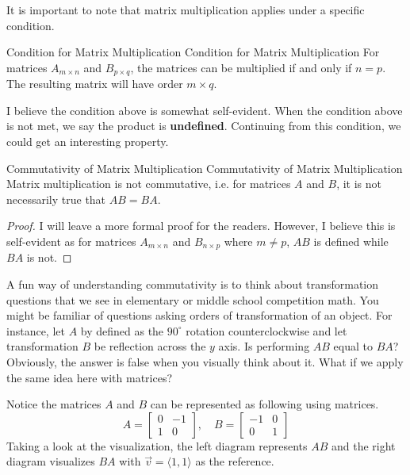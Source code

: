 \documentclass[../main.tex]{subfiles}
\begin{document}
It is important to note that matrix multiplication applies under
a specific condition.

\begin{theorem}{Condition for Matrix Multiplication}
{Condition for Matrix Multiplication}
For matrices $A_{m \times n}$ and $B_{p \times q}$, the matrices
can be multiplied if and only if $n = p$. The resulting matrix
will have order $m \times q$.
\end{theorem}

I believe the condition above is somewhat self-evident. When the
condition above is not met, we say the product is \textbf{undefined}.
Continuing from this condition, we could get an interesting property.

\begin{theorem}{Commutativity of Matrix Multiplication}
{Commutativity of Matrix Multiplication}
Matrix multiplication is not commutative, i.e. for matrices $A$ and
$B$, it is not necessarily true that $AB = BA$.
\end{theorem}
\begin{proof}
I will leave a more formal proof for the readers. However, I believe
this is self-evident as for matrices $A_{m \times n}$ and
$B_{n \times p}$ where $m \neq p$, $AB$ is defined while $BA$ is not.
\end{proof}

A fun way of understanding commutativity is to think about
transformation questions that we see in elementary or middle school
competition math. You might be familiar of questions asking orders
of transformation of an object. For instance, let $A$ by defined
as the $90^\circ$ rotation counterclockwise and let transformation
$B$ be reflection across the $y$ axis. Is performing $AB$ equal to
$BA$? Obviously, the answer is false when you visually think about it.
What if we apply the same idea here with matrices?

Notice the matrices $A$ and $B$ can be represented as following using
matrices.
\[
A =
\begin{bmatrix}
    0 & -1 \\
    1 & 0
\end{bmatrix},
\quad
B =
\begin{bmatrix}
    -1 & 0 \\
    0  & 1
\end{bmatrix}
\]
Taking a look at the visualization, the left diagram represents
$AB$ and the right diagram visualizes $BA$ with $\vec{v} =
\langle 1, 1 \rangle$ as the reference.
\end{document}
